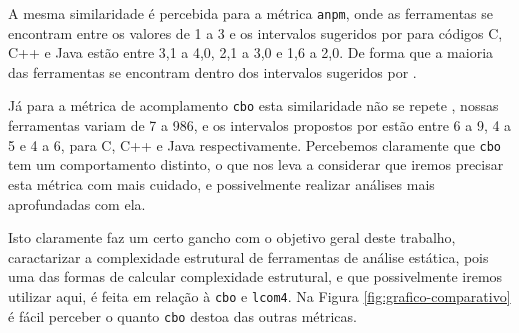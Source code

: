 A mesma similaridade é percebida para a métrica \texttt{anpm}, onde as
ferramentas se encontram entre os valores de 1 a 3 e os intervalos sugeridos por
\cite{Meirelles2013} para códigos C, C++ e Java estão entre 3,1 a 4,0, 2,1 a
3,0 e 1,6 a 2,0. De forma que a maioria das ferramentas se encontram dentro
dos intervalos sugeridos por \cite{Meirelles2013}.

Já para a métrica de acomplamento \texttt{cbo} esta similaridade não se repete
, nossas ferramentas variam de 7 a 986, e os intervalos propostos por
\cite{Meirelles2013} estão entre 6 a 9, 4 a 5 e 4 a 6, para C, C++ e Java
respectivamente. Percebemos claramente que \texttt{cbo} tem um comportamento
distinto, o que nos leva a considerar que iremos precisar esta métrica com
mais cuidado, e possivelmente realizar análises mais aprofundadas com ela.

Isto claramente faz um certo gancho com o objetivo geral deste trabalho,
caractarizar a complexidade estrutural de ferramentas de análise estática,
pois uma das formas de calcular complexidade estrutural, e que possivelmente
iremos utilizar aqui, é feita em relação à \texttt{cbo} e \texttt{lcom4}. Na
Figura \ref{fig:grafico-comparativo} é fácil perceber o quanto \texttt{cbo} destoa
das outras métricas.

